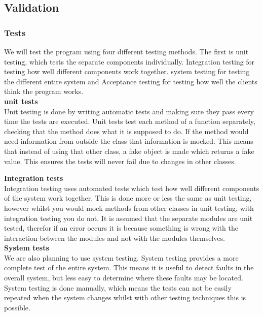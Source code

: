 \subsection{Validation}

\subsubsection{Tests}
We will test the program using four different testing methods. The first is unit testing, which tests the separate components individually. Integration testing for testing how well different components work together. system testing for testing the different entire system and Acceptance testing for testing how well the clients think the program works.\\

\textbf{unit tests}\\
Unit testing is done by writing automatic tests and making sure they pass every time the tests are executed. Unit tests test each method of a function separately, checking that the method does what it is supposed to do. If the method would need information from outside the class that information is mocked. This means that instead of using that other class, a fake object is made which returns a fake value. This ensures the tests will never fail due to changes in other classes. \\

\todo{}

\textbf{Integration tests}\\
Integration testing uses automated tests which test how well different components of the system work together. This is done more or less the same as unit testing, however whilst you would mock methods from other classes in unit testing, with integration testing you do not. It is assumed that the separate modules are unit tested, therefor if an error occurs it is because something is wrong with the interaction between the modules and not with the modules themselves. \\

\textbf{System tests}\\
We are also planning to use system testing. System testing provides a more complete test of the entire system. This means it is useful to detect faults in the overall system, but less easy to determine where these faults may be located. System testing is done manually, which means the tests can not be easily repeated when the system changes whilst with other testing techniques this is possible.\\

